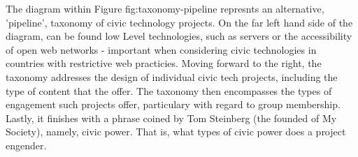 The diagram within Figure {fig:taxonomy-pipeline} represnts an alternative, 'pipeline', taxonomy of civic technology projects.
On the far left hand side of the diagram, can be found low Level technologies, such as servers or the accessibility of open web networks - important when considering civic technologies in countries with restrictive web practicies.
Moving forward to the right, the taxonomy addresses the design of individual civic tech projects, including the type of content that the offer.	
The taxonomy then encompasses the types of engagement such projects offer, particulary with regard to group membership.
Lastly, it finishes with a phrase coined by Tom Steinberg (the founded of My Society), namely, civic power. 
That is, what types of civic power does a project engender.
  